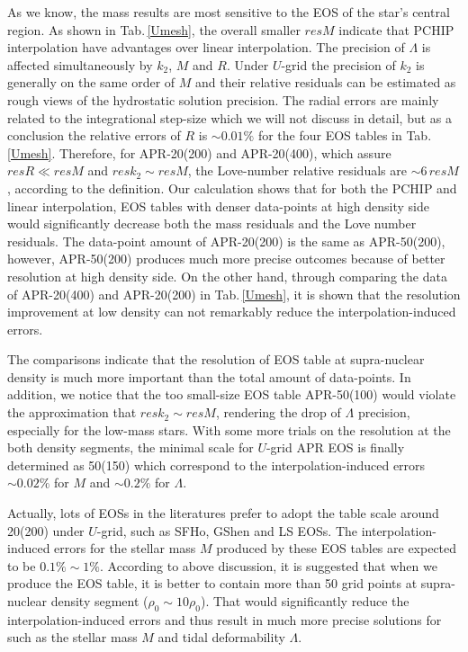 \documentclass[aps,prl,a4paper,twocolumn,floats,amsmath,amssymb,nofootinbib,showpacs]{revtex4-1}
\begin{document}
As we know, the mass results are most sensitive to the EOS of the star's central region. As shown in Tab.$\,$\ref{Umesh}, the overall smaller $resM$ indicate that PCHIP interpolation have advantages over linear interpolation. The precision of $\Lambda$ is affected simultaneously by $k_2$, $M$ and $R$. Under $U$-grid the precision of $k_2$ is generally on the same order of $M$ and their relative residuals can be estimated as rough views of the hydrostatic solution precision. The radial errors are mainly related to the integrational step-size which we will not discuss in detail, but as a conclusion the relative errors of $R$ is $\sim 0.01\%$ for the four EOS tables in Tab.$\,$\ref{Umesh}. Therefore, for APR-20(200) and APR-20(400), which assure $resR \ll resM$ and $resk_2 \sim resM$, the Love-number relative residuals are $\sim 6 \, resM$, according to the definition.
Our calculation shows that for both the PCHIP and linear interpolation, EOS tables with denser data-points at high density side would significantly decrease both the mass residuals and the Love number residuals. The data-point amount of APR-20(200) is the same as APR-50(200), however, APR-50(200) produces much more precise outcomes because of better resolution at high density side. On the other hand, through comparing the data of APR-20(400) and APR-20(200) in Tab.$\,$\ref{Umesh}, it is shown that the resolution improvement at low density  can not remarkably reduce the interpolation-induced errors.

The comparisons indicate that the resolution of EOS table at supra-nuclear density is much more important than the total amount of data-points. In addition, we notice that the too small-size EOS table APR-50(100) would violate the approximation that $resk_2 \sim resM$, rendering the drop of $\Lambda$ precision, especially for the low-mass stars. With some more trials on the resolution at the both density segments, the minimal scale for $U$-grid APR EOS is finally determined as 50(150) which correspond to the interpolation-induced errors $\sim 0.02\%$ for $M$ and $\sim0.2\%$ for $\Lambda$.

Actually, lots of EOSs in the literatures prefer to adopt the table scale around 20(200) under $U$-grid, such as SFHo, GShen and LS EOSs. The interpolation-induced errors for the stellar mass $M$ produced by these EOS tables are expected to be $0.1\% \sim 1\%$. According to above discussion, it is suggested that when we produce the EOS table, it is better to contain more than 50 grid points at supra-nuclear density segment ($\rho_0 \sim 10\rho_0$). That would significantly reduce the interpolation-induced errors and thus result in much more precise solutions for such as the stellar mass $M$ and tidal deformability $\Lambda$.
\end{document}
